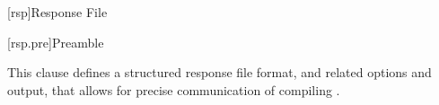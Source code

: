
[rsp]{Response File}

[rsp.pre]{Preamble}

\pnum
This clause defines a structured response file format, and related options and
output, that allows for precise communication of compiling \Cpp.
